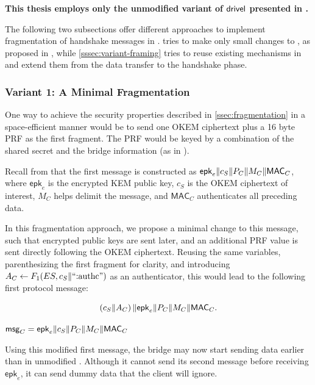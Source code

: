 \textbf{This thesis employs only the unmodified variant of $\textsf{drivel}{}$ presented in \cite[Figure~6]{EPRINT:GRSV25}.}

The following two subsections offer different approaches to implement fragmentation of handshake messages in \drivel{}.  tries to make only small changes to \drivel{}, as proposed in \cite[Figure~6]{EPRINT:GRSV25}, while \cref{sssec:variant-framing} tries to reuse existing mechanisms in \obfsfour{} and extend them from the data transfer to the handshake phase.

\subsubsection{Variant 1: A Minimal Fragmentation} \label{sssec:variant-minimal}

One way to achieve the security properties described in \cref{ssec:fragmentation} in a space-efficient manner would be to send one OKEM ciphertext plus a 16 byte PRF as the first fragment. The PRF would be keyed by a combination of the shared secret and the bridge information (as in \drivel{}).

Recall from \cite[Figure~6]{EPRINT:GRSV25} that the first \drivel{} message is constructed as $\mathsf{epk}_e \| c_S \| P_C \| M_C \| \mathsf{MAC}_C$, where $\mathsf{epk}_e$ is the encrypted KEM public key, $c_S$ is the OKEM ciphertext of interest, $M_C$ helps delimit the message, and $\mathsf{MAC}_C$ authenticates all preceding data.

In this fragmentation approach, we propose a minimal change to this message, such that encrypted public keys are sent later, and an additional PRF value is sent directly following the OKEM ciphertext. Reusing the same variables, parenthesizing the first fragment for clarity, and introducing $A_C \gets F_1(ES, c_S \| \text{``:authc''})$ as an authenticator, this would lead to the following first protocol message:

\[
    \left( c_S \| A_C \right) \| \mathsf{epk}_e \| P_C \| M_C \| \mathsf{MAC}_C .
\]

$\mathsf{msg}_C = \mathsf{epk}_e \| c_S \| P_C \| M_C \| \mathsf{MAC}_C$


Using this modified first message, the bridge may now start sending data earlier than in unmodified \drivel{}. Although it cannot send its second message before receiving $\mathsf{epk}_e$, it can send dummy data that the client will ignore.

